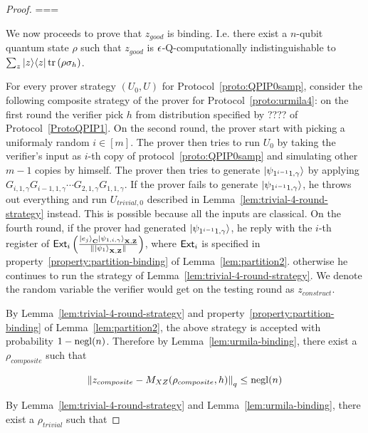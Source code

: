 \begin{proof}
===

We now proceeds to prove that $z_{good}$ is binding. I.e. there exist a $n$-qubit quantum state $\rho$ such that $z_{good}$ is $\epsilon$-Q-computationally indistinguishable to $\sum_z |z\rangle\langle z| \operatorname{tr}\left(\rho \sigma_h \right)$.




For every prover strategy $(U_0,U)$ for Protocol~\ref{proto:QPIP0samp}, consider the following composite strategy of the prover for Protocol~\ref{proto:urmila4}: on the first round the verifier pick $h$ from distribution specified by ???? of Protocol~\ref{ProtoQPIP1}. On the second round, the prover start with picking a uniformaly random $i\in [m]$. The prover then tries to run $U_0$ by taking the verifier's input as $i$-th copy of protocol~\ref{proto:QPIP0samp} and simulating other $m-1$ copies by himself. The prover then   tries to generate $\ket{\psi_{1^{i-1}1,\gamma}}$ by applying $G_{i,1,\gamma}G_{i-1,1,\gamma} \cdots G_{2,1,\gamma}G_{1,1,\gamma}$. If the prover fails to generate $\ket{\psi_{1^{i-1}1,\gamma}}$, he throws out everything and run $U_{trivial,0}$ described  in  Lemma~\ref{lem:trivial-4-round-strategy} instead. This is possible because all the inputs are classical. On the fourth round, if the prover had generated $\ket{\psi_{1^{i-1}1,\gamma}}$, he reply with the $i$-th register of $\mathsf{Ext}_i\left(\frac{\ket{e_j}_{\mathbf{C}}\ket{\psi_{1,i,\gamma}}_{\mathbf{X},\mathbf{Z}}}{\|\ket{\psi_1}_{\mathbf{X},\mathbf{Z}}\|}\right)$, where $\mathsf{Ext}_i$ is specified in property~\ref{property:partition-binding} of Lemma~\ref{lem:partition2}. otherwise he continues to run the strategy of Lemma~\ref{lem:trivial-4-round-strategy}. We denote the random variable the verifier would get on the testing round as $z_{construct}$.


By Lemma~\ref{lem:trivial-4-round-strategy} and property~\ref{property:partition-binding} of Lemma~\ref{lem:partition2}, the above strategy is accepted with probability $1-\operatorname{negl}(n)$. Therefore by Lemma~\ref{lem:urmila-binding}, there exist a $\rho_{composite}$ such that 

\begin{align}
    \left\lVert z_{composite} - M_{XZ}(\rho_{composite},h) \right\rVert_q \leq \operatorname{negl}(n) 
\end{align}

By Lemma~\ref{lem:trivial-4-round-strategy} and Lemma~\ref{lem:urmila-binding}, there exist a $\rho_{trivial}$ such that


\end{proof}
